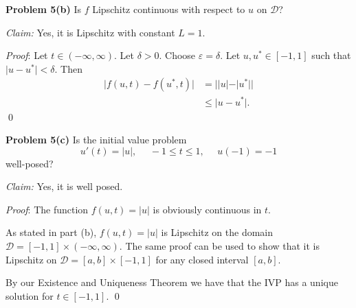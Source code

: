 \documentclass[12pt]{article}
\newcommand{\problem}[1]{\hspace{-4 ex} \large \textbf{Problem #1} }
\renewenvironment{proof}{\hspace{-4 ex} \emph{Proof}:}{\qed}
\begin{document}
\bigbreak
\problem{5(b)} Is $f$ Lipschitz continuous with respect to $u$ on $\mathcal{D}$? \bigbreak

\textit{Claim:} Yes, it is Lipschitz with constant $L = 1$. \bigbreak

\begin{proof}
	Let $t \in (-\infty, \infty)$. Let $\delta >0$. Choose $\varepsilon = \delta$. Let $u, u^* \in [-1, 1]$ such that $\vert u - u^* \vert < \delta$. Then 
	\begin{align*}
		\vert f(u, t) - f(u^*,t) \vert &= \big \vert \vert u \vert - \vert u^* \vert \big \vert  \\
		& \leq \vert u - u^* \vert. \tag{reverse triangle inequality}
	\end{align*}
\end{proof}

\bigbreak
\problem{5(c)} Is the initial value problem 
$$
u'(t) = \vert u \vert, \phantom{=} -1 \leq t \leq 1, \phantom{=}u(-1)=-1
$$
well-posed? \bigbreak

\textit{Claim:} Yes, it is well posed. \bigbreak

\begin{proof}
	The function $f(u,t) = \vert u \vert$ is obviously continuous in $t$. \bigbreak
	
	As stated in part (b), $f(u,t) = \vert u \vert$ is Lipschitz on the domain $\mathcal{D}=[-1,1] \times (-\infty, \infty)$. The same proof can be used to show that it is Lipschitz on $\mathcal{D}=[a,b] \times [-1,1]$ for any closed interval $[a,b]$. \bigbreak
	
	By our Existence and Uniqueness Theorem we have that the IVP has a unique solution for $t \in [-1, 1]$.
\end{proof}
\end{document}
